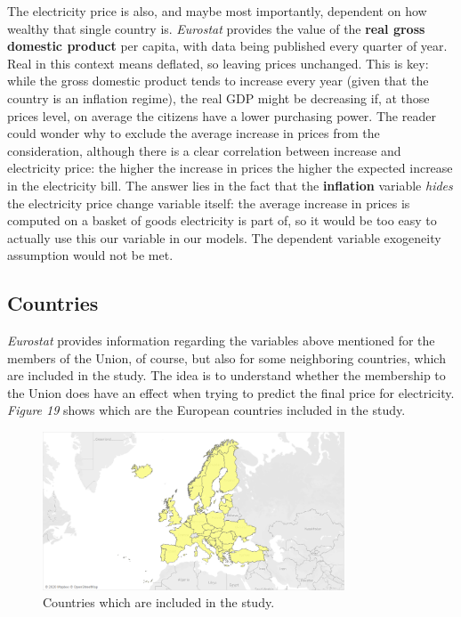 \documentclass{book}
\begin{document}
\noindent The electricity price is also, and maybe most importantly, dependent on how wealthy that single country is. \textit{Eurostat} provides the value of the \textbf{real gross domestic product} per capita, with data being published every quarter of year. Real in this context means deflated, so leaving prices unchanged. This is key: while the gross domestic product tends to increase every year (given that the country is an inflation regime), the real GDP might be decreasing if, at those prices level, on average the citizens have a lower purchasing power. The reader could wonder why to exclude the average increase in prices from the consideration, although there is a clear correlation between increase and electricity price: the higher the increase in prices the higher the expected increase in the electricity bill. The answer lies in the fact that the \textbf{inflation} variable \textit{hides} the electricity price change variable itself: the average increase in prices is computed on a basket of goods electricity is part of, so it would be too easy to actually use this our variable in our models. The dependent variable exogeneity assumption would not be met.

\subsection*{Countries}

\textit{Eurostat} provides information regarding the variables above mentioned for the members of the Union, of course, but also for some neighboring countries, which are included in the study. The idea is to understand whether the membership to the Union does have an effect when trying to predict the final price for electricity. \textit{Figure 19} shows which are the European countries included in the study.

\bigskip
\begin{figure}[H]
\begin{center}
\captionsetup{justification=centering}
\includegraphics[width=0.8\textwidth]{Images/cantries.png}
\caption{Countries which are included in the study.}
\end{center}
\end{figure}
\bigskip
\end{document}
